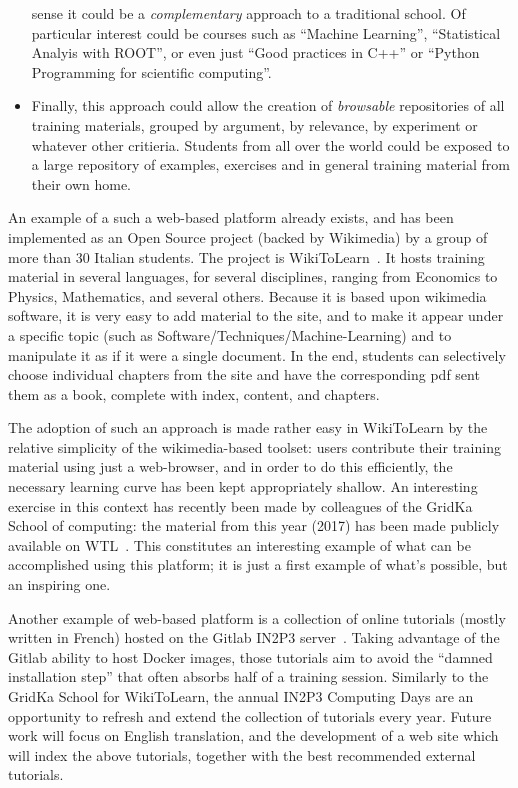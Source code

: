 \documentclass[12pt,a4paper]{article}
\begin{document}
\begin{itemize}
   sense it could be a {\it complementary} approach to a traditional school. Of
   particular interest could be courses such as ``Machine Learning'',
   ``Statistical Analyis with ROOT'', or even just ``Good practices in C++'' or
   ``Python Programming for scientific computing''.
   \item Finally, this approach could allow the creation of {\it browsable}
   repositories of all training materials, grouped by argument, by relevance, by
   experiment or whatever other critieria. Students from all over the world
   could be exposed to a large repository of examples, exercises and in general
   training material from their own home.
\end{itemize}

An example of a such a web-based platform already exists, and has been
implemented as an Open Source project (backed by Wikimedia) by a group of more
than 30 Italian students. The project is WikiToLearn~\cite{WikiToLearn}. It hosts training material in
several languages, for several disciplines, ranging from Economics to Physics,
Mathematics, and several others. Because it is based upon
wikimedia~\cite{WikiMedia} software, it is very easy
to add material to the site, and to make it appear under a specific topic (such
as Software/Techniques/Machine-Learning) and to manipulate it as if it
were a single document. In the end, students can selectively choose individual
chapters from the site and have the corresponding pdf sent them as a book,
complete with index, content, and chapters.

The adoption of such an approach is made rather easy in WikiToLearn by the
relative simplicity of the wikimedia-based toolset: users contribute their
training material using just a web-browser, and in order to do this efficiently,
the necessary learning curve has been kept appropriately shallow.
An interesting exercise in this context has recently been made by colleagues of
the GridKa School of computing: the material from this year (2017) has been made
publicly available on WTL~\cite{WikiToLearnGridka}.
This constitutes an interesting example of what can be accomplished using this
platform; it is just a first example of what's possible, but an inspiring one.

Another example of web-based platform is a collection of online tutorials
(mostly written in French) hosted on the Gitlab IN2P3
server~\cite{Code-Swim-Coaches}. Taking advantage of
the Gitlab ability to host Docker images, those tutorials aim to avoid the
``damned installation step'' that often absorbs half of a training session.
Similarly to the GridKa School for WikiToLearn, the annual IN2P3 Computing
Days are an opportunity to refresh and extend the collection of
tutorials every year. Future work will focus on English translation, and the
development of a web site which will index the above tutorials, together with
the best recommended external tutorials.
\end{document}
